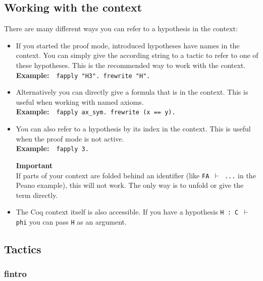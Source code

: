 \documentclass[12pt, a4paper]{article}
\newcommand{\coq}[1]{\texttt{#1}}
\newcommand{\important}[1]{
	\vspace{3pt}
	\begin{boximportant}
		\parbox{\textwidth}{\textcolor{colorimportant}{\textbf{Important}\\#1}}
	\end{boximportant}}
\newcommand{\example}[1]{\medskip\\\textbf{Example:}~~#1}
\begin{document}
\subsection{Working with the context}

There are many different ways you can refer to a hypothesis in the context:
\begin{itemize}
	\item 
	If you started the proof mode, introduced hypotheses have names in the context. 
	You can simply give the according string to a tactic to refer to one of these hypotheses. 
	This is the recommended way to work with the context.
	\example{\coq{fapply "H3". frewrite "H".}}
	
	\item 
	Alternatively you can directly give a formula that is in the context. 
	This is useful when working with named axioms.
	\example{\coq{fapply ax_sym. frewrite (x == y).}}
	
	\item 
	You can also refer to a hypothesis by its index in the context. 
	This is useful when the proof mode is not active.
	\example{\coq{fapply 3.}}
	\important{If parts of your context are folded behind an identifier (like \texttt{FA $\vdash$ ...} in the Peano example), this will not work. The only way is to unfold or give the term directly.}
	
	\item 
	The Coq context itself is also accessible. 
	If you have a hypothesis \texttt{H : C $\vdash$ phi} you can pass \texttt{H} as an argument.
\end{itemize}




\subsection{Tactics}

\subsubsection{\ttfamily fintro}
\end{document}

